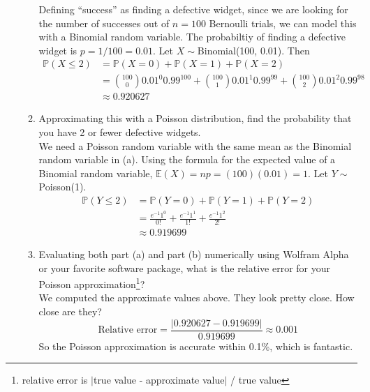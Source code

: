 \documentclass[12pt]{article}
\def\P{{\mathbb P}}
\def\E{{\mathbb E}}
\begin{document}
\begin{enumerate}
\begin{enumerate}
Defining ``success'' as finding a defective widget, since we are looking for the number of successes out of $n =100$ Bernoulli trials, we can model this with a Binomial random variable. The probabiltiy of finding a defective widget is $p = 1/100 = 0.01$. Let $X\sim$Binomial(100, 0.01). Then
\begin{align*}
\P(X \leq 2) &= \P(X = 0) + \P(X = 1) + \P(X = 2) \\
&= \binom{100}{0}0.01^0 0.99^{100} + \binom{100}{1}0.01^1 0.99^{99} + \binom{100}{2}0.01^2 0.99^{98}\\
&\approx 0.920627
\end{align*}
\item Approximating this with a Poisson distribution, find the probability that you have 2 or fewer defective widgets.\\

We need a Poisson random variable with the same mean as the Binomial random variable in (a). Using the formula for the expected value of a Binomial random variable, $\E(X) = np = (100)(0.01) = 1$. Let $Y \sim$Poisson(1).
\begin{align*}
\P(Y \leq 2) &= \P(Y = 0) + \P(Y = 1) + \P(Y = 2) \\
&= \frac{e^{-1} 1^0}{0!} + \frac{e^{-1} 1^1}{1!} + \frac{e^{-1} 1^2}{2!}\\
&\approx 0.919699
\end{align*}

\item Evaluating both part (a) and part (b) numerically using Wolfram Alpha or your favorite software package, what is the relative error for your Poisson approximation\footnote{relative error is $|$true value - approximate value$|$ / true value}?\\

We computed the approximate values above. They look pretty close. How close are they?
\[
\text{Relative error} = \frac{ |0.920627 - 0.919699| }{0.919699} \approx 0.001
\]
So the Poisson approximation is accurate within 0.1\%, which is fantastic.
\end{enumerate}

\end{enumerate}
\end{document}

